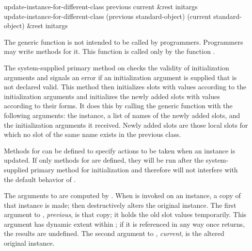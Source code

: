 \begin{defun}
update-instance-for-different-class previous current &rest initargs \\
update-instance-for-different-class (previous standard-object)
     (current standard-object) &rest initargs

The generic function  is not
intended to be called by programmers.  Programmers may write
methods for it.  This function is called only by the function .

The system-supplied primary method on 
 checks the validity of
initialization arguments and signals an error if an initialization
argument is supplied that is not declared valid.  This method then
initializes slots with values according to the initialization
arguments and initializes the newly added slots with values according
to their  forms.  It does this by calling the generic
function  with the following arguments: the instance,
a list of names of the newly added slots, and the initialization
arguments it received.  Newly added slots are those local slots for which
no slot of the same name exists in the previous class.

Methods for
can be defined to
specify actions to be taken when an instance is updated.  If only 
 methods for  are
defined, they will be run after the system-supplied primary method for
initialization and therefore will not interfere with the default
behavior of .





The arguments to  are
computed by .  When  is invoked on
an instance, a copy of that instance is made;  then
destructively alters the original instance.  The first argument to
, \emph{previous\/}, is that
copy; it holds the old slot values temporarily.  This argument has
dynamic extent within ; if it is referenced in any
way once  returns, the
results are undefined.  The second argument to 
, \emph{current}, is the altered
original instance.



\end{defun}
